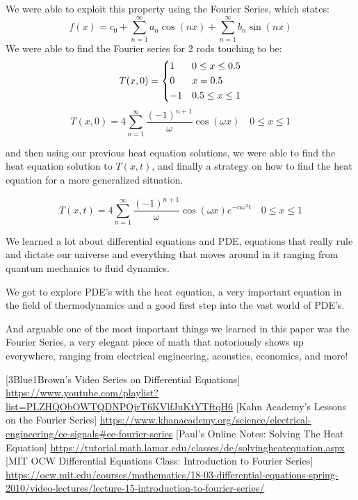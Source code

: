 \documentclass{report}
\begin{document}
We were able to exploit this property using the Fourier Series, which states:
\[ f(x)= c_0 + \sum_{n=1}^{\infty} a_n\cos(nx) + \sum_{n=1}^{\infty} b_n\sin(nx) \]
We were able to find the Fourier series for 2 rods touching to be: 
\[ T(x,0) =
    \begin{dcases}
        1 & 0\leq x \leq 0.5 \\
        0 & x = 0.5 \\
        -1 & 0.5 \leq x \leq 1 \\
    \end{dcases}
\]
\[T(x,0) = 4\sum_{n=1}^{\infty}\frac{\left(-1\right)^{n+1}}{\omega}\cos\left(\omega x\right) \quad 0\leq x \leq 1 \]

and then using our previous heat equation solutions, we were able to find the heat equation solution to $T(x,t)$, and finally a strategy on how to find the heat equation for a more generalized situation.

\[T(x,t) = 4\sum_{n=1}^{\infty}\frac{\left(-1\right)^{n+1}}{\omega}\cos\left(\omega x\right)e^{-\alpha\omega^2t} \quad 0\leq x \leq 1 \]

We learned a lot about differential equations and PDE, equations that really rule and dictate our universe and everything that moves around in it ranging from quantum mechanics to fluid dynamics. 

We got to explore PDE's with the heat equation, a very important equation in the field of thermodynamics and a good first step into the vast world of PDE's. 

And arguable one of the most important things we learned in this paper was the Fourier Series, a very elegant piece of math that notoriously shows up everywhere, ranging from electrical engineering, acoustics, economics, and more! 

\begin{thebibliography}{5}
  [3Blue1Brown's Video Series on Differential Equations] \url{https://www.youtube.com/playlist?list=PLZHQObOWTQDNPOjrT6KVlfJuKtYTftqH6}
  [Kahn Academy's Lessons on the Fourier Series] \url{https://www.khanacademy.org/science/electrical-engineering/ee-signals\#ee-fourier-series}
  [Paul's Online Notes: Solving The Heat Equation] \url{https://tutorial.math.lamar.edu/classes/de/solvingheatequation.aspx}
  [MIT OCW Differential Equations Class: Introduction to Fourier Series] \url{https://ocw.mit.edu/courses/mathematics/18-03-differential-equations-spring-2010/video-lectures/lecture-15-introduction-to-fourier-series/}
\end{thebibliography}
\end{document}
